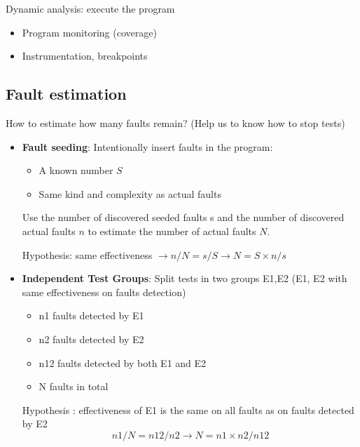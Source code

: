 Dynamic analysis: execute the program

\begin{itemize}
    \item Program monitoring (coverage)
    \item Instrumentation, breakpoints
\end{itemize}

\subsection{Fault estimation}

How to estimate how many faults remain? (Help us to know how to stop tests) 

\begin{itemize}
        \item \textbf{Fault seeding}: Intentionally insert faults in the program:

\begin{itemize}
    \item A known number $S$
    \item Same kind and complexity as actual faults
\end{itemize}

Use the number of discovered seeded faults s and the number of discovered actual faults $n$ to estimate the number of actual faults $N$.

Hypothesis: same effectiveness $\rightarrow n / N = s / S \rightarrow N = S \times n / s$


\item \textbf{Independent Test Groups}: Split tests in two groups E1,E2
    (E1, E2 with same effectiveness on faults detection)

\begin{itemize}
	\item n1 faults detected by E1
	\item n2 faults detected by E2
	\item n12 faults detected by both E1 and E2
	\item N faults in total
\end{itemize} 

Hypothesis : effectiveness of E1 is the same on all faults as on faults
detected by E2
$$ n1/N=n12/n2 \rightarrow N = n1\times n2/n12$$
\end{itemize}

